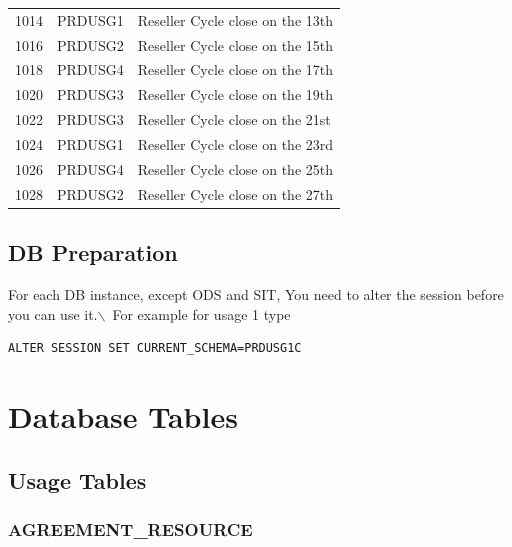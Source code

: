 \documentclass[12pt,twoside]{article}
\begin{document}
\begin{longtable}{c|l|l}
1014 & PRDUSG1 & Reseller Cycle close on the 13th\\
1016 & PRDUSG2 & Reseller Cycle close on the 15th\\
1018 & PRDUSG4 & Reseller Cycle close on the 17th\\
1020 & PRDUSG3 & Reseller Cycle close on the 19th\\
1022 & PRDUSG3 & Reseller Cycle close on the 21st\\
1024 & PRDUSG1 & Reseller Cycle close on the 23rd\\
1026 & PRDUSG4 & Reseller Cycle close on the 25th\\
1028 & PRDUSG2 & Reseller Cycle close on the 27th\\
\hline
\end{longtable}
\normalsize
\subsection{DB Preparation}
\label{sec:orgheadline67}
For each DB instance, except ODS and SIT, You need to alter the
session before you can use it.$\backslash$\ For example for usage 1 type
\begin{verbatim}
ALTER SESSION SET CURRENT_SCHEMA=PRDUSG1C
\end{verbatim}
\section{Database Tables}
\label{sec:orgheadline150}
\subsection{Usage Tables}
\label{sec:orgheadline80}
\subsubsection{AGREEMENT\_RESOURCE}
\label{sec:orgheadline69}
\footnotesize
\end{document}
